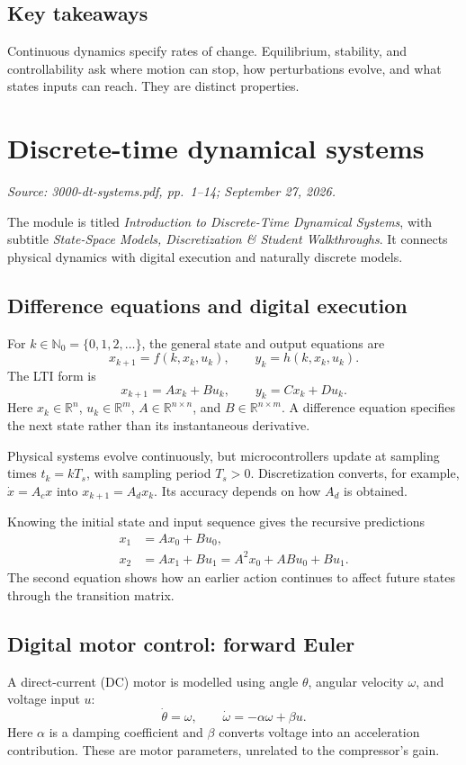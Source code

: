 \documentclass[11pt,a4paper]{article}
\numberwithin{equation}{section}
\numberwithin{figure}{section}
\numberwithin{table}{section}
\newcommand{\source}[1]{\par{\small\color{muted}\textit{Source: #1.}}\par}
\newcommand{\module}[2]{\clearpage\section{#1}\source{#2}}
\newcommand{\R}{\mathbb{R}}
\begin{document}
\subsection{Key takeaways}
Continuous dynamics specify rates of change. Equilibrium, stability, and controllability ask where motion can stop, how perturbations evolve, and what states inputs can reach. They are distinct properties.

\module{Discrete-time dynamical systems}{3000-dt-systems.pdf, pp.\ 1--14; September 27, 2026}
The module is titled \emph{Introduction to Discrete-Time Dynamical Systems}, with subtitle \emph{State-Space Models, Discretization \& Student Walkthroughs}. It connects physical dynamics with digital execution and naturally discrete models.

\subsection{Difference equations and digital execution}
For $k\in\mathbb N_0=\{0,1,2,\ldots\}$, the general state and output equations are
\begin{equation}x_{k+1}=f(k,x_k,u_k),\qquad y_k=h(k,x_k,u_k).\end{equation}
The LTI form is
\begin{equation}\label{eq:dtlti}x_{k+1}=Ax_k+Bu_k,\qquad y_k=Cx_k+Du_k.\end{equation}
Here $x_k\in\R^n$, $u_k\in\R^m$, $A\in\R^{n\times n}$, and $B\in\R^{n\times m}$. A difference equation specifies the next state rather than its instantaneous derivative.

Physical systems evolve continuously, but microcontrollers update at sampling times $t_k=kT_s$, with sampling period $T_s>0$. Discretization converts, for example, $\dot x=A_cx$ into $x_{k+1}=A_dx_k$. Its accuracy depends on how $A_d$ is obtained.

Knowing the initial state and input sequence gives the recursive predictions
\begin{align*}
x_1&=Ax_0+Bu_0,\\
x_2&=Ax_1+Bu_1=A^2x_0+ABu_0+Bu_1.
\end{align*}
The second equation shows how an earlier action continues to affect future states through the transition matrix.

\subsection{Digital motor control: forward Euler}
A direct-current (DC) motor is modelled using angle $\theta$, angular velocity $\omega$, and voltage input $u$:
\begin{equation}\label{eq:motorct}\dot\theta=\omega,\qquad\dot\omega=-\alpha\omega+\beta u.\end{equation}
Here $\alpha$ is a damping coefficient and $\beta$ converts voltage into an acceleration contribution. These are motor parameters, unrelated to the compressor's gain.
\end{document}
